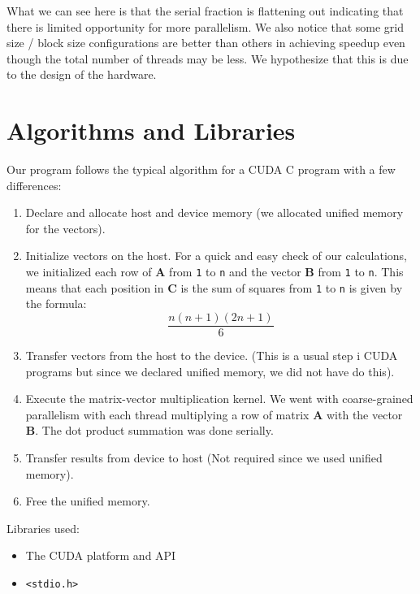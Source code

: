 \documentclass{article}
\begin{document}
\medskip
\noindent
What we can see here is that the serial fraction is flattening out indicating 
that there is limited opportunity for more parallelism. We also notice that some
grid size / block size configurations are better than others in achieving 
speedup even though the total number of threads may be less. We hypothesize that
this is due to the design of the hardware.

\section{Algorithms and Libraries}
Our program follows the typical algorithm for a CUDA C program with a few 
differences:
\begin{enumerate}
    \item Declare and allocate host and device memory (we allocated unified 
    memory for the vectors).
    
    \item Initialize vectors on the host. For a quick and easy check of our 
    calculations, we initialized each row of \textbf{A} from \texttt{1} to
    \texttt{n} and the vector \textbf{B} from
    \texttt{1} to \texttt{n}. This means that each position in \textbf{C} is the
    sum of squares from \texttt{1} to \texttt{n} is given by the formula:
    \[ \frac{n (n + 1) (2n + 1)}{6} \]
    
    \item Transfer vectors from the host to the device. (This is a usual step i
    CUDA programs but since we declared unified memory, we did not have do
    this).
    
    \item Execute the matrix-vector multiplication kernel. We went with 
    coarse-grained parallelism with each thread multiplying a row of matrix 
    \textbf{A} with the vector \textbf{B}. The dot product summation was done 
    serially. 
    
    \item Transfer results from device to host (Not required since we used 
    unified memory).
    
    \item Free the unified memory.
\end{enumerate}

\medskip
\noindent
Libraries used:
\begin{itemize}
	\item The CUDA platform and API
    \item \texttt{<stdio.h>}
\end{itemize}
\end{document}
